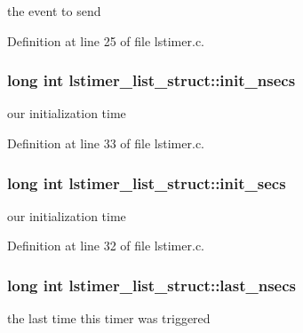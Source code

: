 the event to send 



Definition at line 25 of file lstimer.\-c.

\hypertarget{structlstimer__list__struct_a72665e0a227b5ee0c82aee43dfaf440a}{
\subsubsection[{init\-\_\-nsecs}]{\setlength{\rightskip}{0pt plus 5cm}long int lstimer\-\_\-list\-\_\-struct\-::init\-\_\-nsecs}}\label{structlstimer__list__struct_a72665e0a227b5ee0c82aee43dfaf440a}


our initialization time 



Definition at line 33 of file lstimer.\-c.

\hypertarget{structlstimer__list__struct_a9633d830ecdce7852530079bb09a6d3c}{
\subsubsection[{init\-\_\-secs}]{\setlength{\rightskip}{0pt plus 5cm}long int lstimer\-\_\-list\-\_\-struct\-::init\-\_\-secs}}\label{structlstimer__list__struct_a9633d830ecdce7852530079bb09a6d3c}


our initialization time 



Definition at line 32 of file lstimer.\-c.

\hypertarget{structlstimer__list__struct_a0b2ab04246481397116ac9770c3c6603}{
\subsubsection[{last\-\_\-nsecs}]{\setlength{\rightskip}{0pt plus 5cm}long int lstimer\-\_\-list\-\_\-struct\-::last\-\_\-nsecs}}\label{structlstimer__list__struct_a0b2ab04246481397116ac9770c3c6603}


the last time this timer was triggered 




